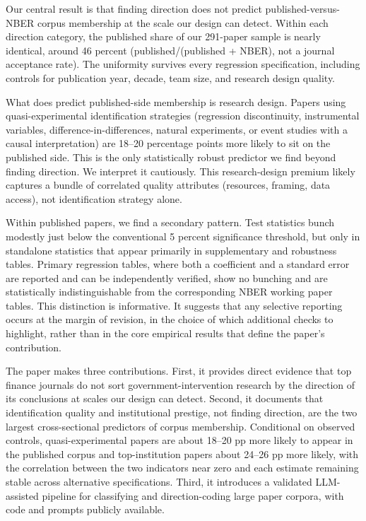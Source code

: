 \documentclass[12pt]{article}
\begin{document}
Our central result is that finding direction does not predict
published-versus-NBER corpus membership at the scale our design can
detect.  Within each direction category, the published share of our
291-paper sample is nearly identical, around 46 percent
(published/(published + NBER), not a journal acceptance rate).  The
uniformity survives every regression specification, including controls
for publication year, decade, team size, and research design quality.

What does predict published-side membership is research design.  Papers
using quasi-experimental identification strategies (regression
discontinuity, instrumental variables, difference-in-differences,
natural experiments, or event studies with a causal interpretation)
are 18--20 percentage points more likely to sit on the published side.  This is
the only statistically robust predictor we find beyond finding
direction.  We interpret it cautiously.  This research-design premium
likely captures a bundle of correlated quality attributes
(resources, framing, data access), not identification strategy alone.

Within published papers, we find a secondary pattern.  Test statistics
bunch modestly just below the conventional 5 percent significance threshold,
but only in standalone statistics that appear primarily in supplementary and
robustness tables.  Primary regression tables, where both a coefficient and
a standard error are reported and can be independently verified, show no
bunching and are statistically indistinguishable from the corresponding NBER
working paper tables.  This distinction is informative.  It suggests that
any selective reporting occurs at the margin of revision, in the choice of
which additional checks to highlight, rather than in the core empirical
results that define the paper's contribution.

The paper makes three contributions.  First, it provides direct evidence that top finance journals do not sort government-intervention research by the direction of its conclusions at scales our design can detect.  Second, it documents that identification quality and institutional prestige, not finding direction, are the two largest cross-sectional predictors of corpus membership. Conditional on observed controls, quasi-experimental papers are about 18--20 pp more likely to appear in the published corpus and top-institution papers about 24--26 pp more likely, with the correlation between the two indicators near zero and each estimate remaining stable across alternative specifications.  Third, it introduces a validated LLM-assisted pipeline for classifying and direction-coding large paper corpora, with code and prompts publicly available.
\end{document}
